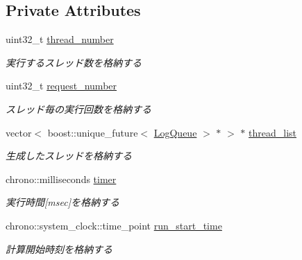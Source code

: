 \subsection*{Private Attributes}
\begin{DoxyCompactItemize}
\item 
\mbox{\label{class_session_aef9ab24b7bf5b9323d126d2f87ae29c8}} 
uint32\+\_\+t \mbox{\hyperlink{class_session_aef9ab24b7bf5b9323d126d2f87ae29c8}{thread\+\_\+number}}
\begin{DoxyCompactList}\small\item\em 実行するスレッド数を格納する \end{DoxyCompactList}\item 
\mbox{\label{class_session_a8e0e6196c88d75c190fb38054fa02c53}} 
uint32\+\_\+t \mbox{\hyperlink{class_session_a8e0e6196c88d75c190fb38054fa02c53}{request\+\_\+number}}
\begin{DoxyCompactList}\small\item\em スレッド毎の実行回数を格納する \end{DoxyCompactList}\item 
\mbox{\label{class_session_aecca10a5ed03f04cdb9d30a69ff220a0}} 
vector$<$ boost\+::unique\+\_\+future$<$ \mbox{\hyperlink{class_log_queue}{Log\+Queue}} $>$ $\ast$ $>$ $\ast$ \mbox{\hyperlink{class_session_aecca10a5ed03f04cdb9d30a69ff220a0}{thread\+\_\+list}}
\begin{DoxyCompactList}\small\item\em 生成したスレッドを格納する \end{DoxyCompactList}\item 
\mbox{\label{class_session_ad6d63231c9ebb745496a8c30c3c432de}} 
chrono\+::milliseconds \mbox{\hyperlink{class_session_ad6d63231c9ebb745496a8c30c3c432de}{timer}}
\begin{DoxyCompactList}\small\item\em 実行時間\mbox{[}msec\mbox{]}を格納する \end{DoxyCompactList}\item 
\mbox{\label{class_session_afa6fedb9c26219352907e9c2ce7f03ae}} 
chrono\+::system\+\_\+clock\+::time\+\_\+point \mbox{\hyperlink{class_session_afa6fedb9c26219352907e9c2ce7f03ae}{run\+\_\+start\+\_\+time}}
\begin{DoxyCompactList}\small\item\em 計算開始時刻を格納する \end{DoxyCompactList}\item 

\end{DoxyCompactItemize}
